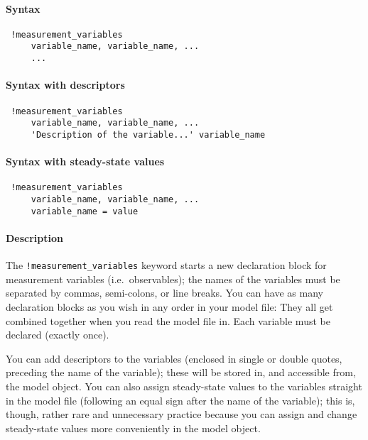 


	\paragraph{Syntax}
 
 \begin{verbatim}
 !measurement_variables
     variable_name, variable_name, ...
     ...
 \end{verbatim}
 
 \paragraph{Syntax with descriptors}
 
 \begin{verbatim}
 !measurement_variables
     variable_name, variable_name, ...
     'Description of the variable...' variable_name
 \end{verbatim}
 
 \paragraph{Syntax with steady-state values}
 
 \begin{verbatim}
 !measurement_variables
     variable_name, variable_name, ...
     variable_name = value
 \end{verbatim}
 
 \paragraph{Description}
 
 The \texttt{!measurement\_variables} keyword starts a new declaration
 block for measurement variables (i.e.~observables); the names of the
 variables must be separated by commas, semi-colons, or line breaks. You
 can have as many declaration blocks as you wish in any order in your
 model file: They all get combined together when you read the model file
 in. Each variable must be declared (exactly once).
 
 You can add descriptors to the variables (enclosed in single or double
 quotes, preceding the name of the variable); these will be stored in,
 and accessible from, the model object. You can also assign steady-state
 values to the variables straight in the model file (following an equal
 sign after the name of the variable); this is, though, rather rare and
 unnecessary practice because you can assign and change steady-state
 values more conveniently in the model object.
 
